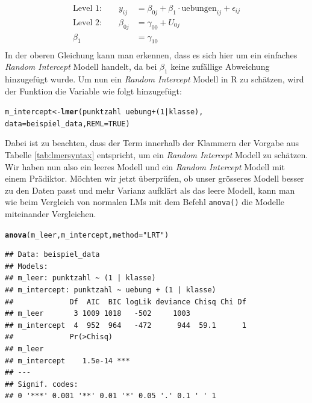 \documentclass[12pt, a4paper]{article}\usepackage[]{graphicx}\usepackage[]{color}
\makeatletter
\newcommand{\hlnum}[1]{\textcolor[rgb]{0.686,0.059,0.569}{#1}}%
\newcommand{\hlstr}[1]{\textcolor[rgb]{0.192,0.494,0.8}{#1}}%
\newcommand{\hlopt}[1]{\textcolor[rgb]{0,0,0}{#1}}%
\newcommand{\hlstd}[1]{\textcolor[rgb]{0.345,0.345,0.345}{#1}}%
\newcommand{\hlkwb}[1]{\textcolor[rgb]{0.69,0.353,0.396}{#1}}%
\newcommand{\hlkwc}[1]{\textcolor[rgb]{0.333,0.667,0.333}{#1}}%
\newcommand{\hlkwd}[1]{\textcolor[rgb]{0.737,0.353,0.396}{\textbf{#1}}}%
\newenvironment{kframe}{%
 \def\at@end@of@kframe{}%
 \ifinner\ifhmode%
  \def\at@end@of@kframe{\end{minipage}}%
  \begin{minipage}{\columnwidth}%
 \fi\fi%
 \def\FrameCommand##1{\hskip\@totalleftmargin \hskip-\fboxsep
 \colorbox{shadecolor}{##1}\hskip-\fboxsep
     \hskip-\linewidth \hskip-\@totalleftmargin \hskip\columnwidth}%
 \MakeFramed {\advance\hsize-\width
   \@totalleftmargin\z@ \linewidth\hsize
   \@setminipage}}%
 {\par\unskip\endMakeFramed%
 \at@end@of@kframe}
\newenvironment{knitrout}{}{} %
\makeatother
\begin{document}
\begin{equation}
\begin{split}	
 \text{Level 1:}  \qquad y_{ij} & = \beta_{0j} + \beta_{1} \cdot \text{uebungen}_{ij} + \epsilon_{ij}\\
 \text{Level 2:} \qquad \beta_{0j} & = \gamma_{00} + U_{0j}\\
 \beta_{1} & = \gamma_{10}\\
\end{split}	
\end{equation} 
In der oberen Gleichung kann man erkennen, dass es sich hier um ein einfaches \textit{Random Intercept} Modell handelt, da bei $\beta_{1}$ keine zufällige Abweichung hinzugefügt wurde. Um nun ein \textit{Random Intercept} Modell in R zu schätzen, wird der Funktion die Variable wie folgt hinzugefügt:

\singlespacing
\begin{knitrout}
\color{fgcolor}\begin{kframe}
\begin{alltt}
\hlstd{m_intercept} \hlkwb{<-} \hlkwd{lmer}\hlstd{(punktzahl} \hlopt{~} \hlstd{uebung} \hlopt{+} \hlstd{(}\hlnum{1} \hlopt{|} \hlstd{klasse),}
        \hlkwc{data} \hlstd{= beispiel_data,} \hlkwc{REML} \hlstd{=} \hlnum{TRUE}\hlstd{)}
\end{alltt}
\end{kframe}
\end{knitrout}

Dabei ist zu beachten, dass der Term innerhalb der Klammern der Vorgabe aus Tabelle \ref{tab:lmersyntax} entspricht, um ein \textit{Random Intercept} Modell zu schätzen. Wir haben nun also ein leeres Modell und ein \textit{Random Intercept} Modell mit einem Prädiktor. Möchten wir jetzt überprüfen, ob unser grösseres Modell besser zu den Daten passt und mehr Varianz aufklärt als das leere Modell, kann man wie beim Vergleich von normalen LMs mit dem Befehl \texttt{anova()} die Modelle miteinander Vergleichen. 

\singlespacing
\begin{knitrout}
\color{fgcolor}\begin{kframe}
\begin{alltt}
\hlkwd{anova}\hlstd{(m_leer, m_intercept,} \hlkwc{method} \hlstd{=} \hlstr{"LRT"}\hlstd{)}
\end{alltt}


{\ttfamily\noindent\itshape\color{messagecolor}{\#\# refitting model(s) with ML (instead of REML)}}\begin{verbatim}
## Data: beispiel_data
## Models:
## m_leer: punktzahl ~ (1 | klasse)
## m_intercept: punktzahl ~ uebung + (1 | klasse)
##             Df  AIC  BIC logLik deviance Chisq Chi Df
## m_leer       3 1009 1018   -502     1003             
## m_intercept  4  952  964   -472      944  59.1      1
##             Pr(>Chisq)    
## m_leer                    
## m_intercept    1.5e-14 ***
## ---
## Signif. codes:  
## 0 '***' 0.001 '**' 0.01 '*' 0.05 '.' 0.1 ' ' 1
\end{verbatim}
\end{kframe}
\end{knitrout}
\end{document}
